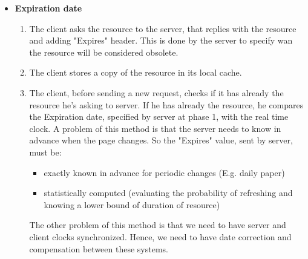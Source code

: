 \begin{itemize}
\item{\textbf{Expiration date}
\begin{enumerate}
\item{The client asks the resource to the server, that replies with the resource and adding "Expires" header. This is done by the server to specify wan the resource will be considered obsolete.}
\item{The client stores a copy of the resource in its local cache.}
\item{The client, before sending a new request, checks if it has already the resource he's asking to server. If he has already the resource, he compares the Expiration date, specified by server at phase 1, with the real time clock. }
A problem of this method is that the server needs to know in advance when the page changes. So the "Expires" value, sent by server, must be:
\begin{itemize}
\item{exactly known in advance for periodic changes (E.g. daily paper)}
\item{statistically computed (evaluating the probability of refreshing and knowing a lower bound of duration of resource)}
\end{itemize}
The other problem of this method is that we need to have server and client clocks synchronized. Hence, we need to have date correction and compensation between these systems.
\end{enumerate}
\begin{figure}[h]
\centering

\end{figure}}
\end{itemize}

